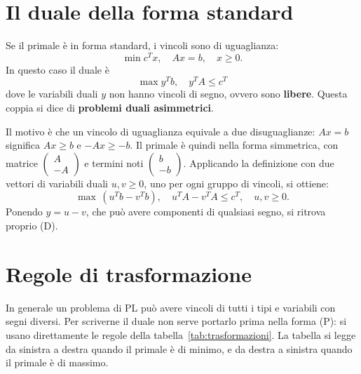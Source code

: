 \section{Il duale della forma standard}\label{sec:duale-standard}
Se il primale è in forma standard, i vincoli sono di uguaglianza:
\[
\min c^T x, \quad A x = b, \quad x \ge 0. \tag{P}
\]
In questo caso il duale è
\[
\max y^T b, \quad y^T A \le c^T \tag{D}
\]
dove le variabili duali $y$ non hanno vincoli di segno, ovvero sono \textbf{libere}. Questa coppia si dice di \textbf{problemi duali asimmetrici}.

Il motivo è che un vincolo di uguaglianza equivale a due disuguaglianze: $Ax = b$ significa $Ax \ge b$ e $-Ax \ge -b$. Il primale è quindi nella forma simmetrica, con matrice $\begin{pmatrix} A \\ -A \end{pmatrix}$ e termini noti $\begin{pmatrix} b \\ -b \end{pmatrix}$. Applicando la definizione con due vettori di variabili duali $u, v \ge 0$, uno per ogni gruppo di vincoli, si ottiene:
\[
\max\, (u^T b - v^T b), \quad u^T A - v^T A \le c^T, \quad u, v \ge 0.
\]
Ponendo $y = u - v$, che può avere componenti di qualsiasi segno, si ritrova proprio (D).

\section{Regole di trasformazione}\label{sec:regole-duale}
In generale un problema di PL può avere vincoli di tutti i tipi e variabili con segni diversi. Per scriverne il duale non serve portarlo prima nella forma (P): si usano direttamente le regole della tabella~\ref{tab:trasformazioni}. La tabella si legge da sinistra a destra quando il primale è di minimo, e da destra a sinistra quando il primale è di massimo.

